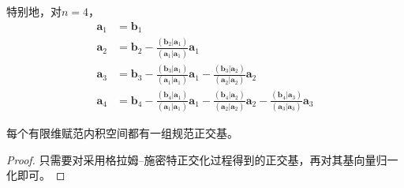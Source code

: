 \documentclass[../main.tex]{subfiles}
\begin{document}
特别地，对$n=4$，
\begin{align*}
    \mathbf{a}_1 & =\mathbf{b}_1                                                                                                                                                                                                                                                                                                       \\
    \mathbf{a}_2 & =\mathbf{b}_2-\frac{\left(\mathbf{b}_2|\mathbf{a}_1\right)}{\left(\mathbf{a}_1|\mathbf{a}_1\right)}\mathbf{a}_1                                                                                                                                                                                                     \\
    \mathbf{a}_3 & =\mathbf{b}_3-\frac{\left(\mathbf{b}_3|\mathbf{a}_1\right)}{\left(\mathbf{a}_1|\mathbf{a}_1\right)}\mathbf{a}_1-\frac{\left(\mathbf{b}_3|\mathbf{a}_2\right)}{\left(\mathbf{a}_2|\mathbf{a}_2\right)}\mathbf{a}_2                                                                                                   \\
    \mathbf{a}_4 & =\mathbf{b}_4-\frac{\left(\mathbf{b}_4|\mathbf{a}_1\right)}{\left(\mathbf{a}_1|\mathbf{a}_1\right)}\mathbf{a}_1-\frac{\left(\mathbf{b}_4|\mathbf{a}_2\right)}{\left(\mathbf{a}_2|\mathbf{a}_2\right)}\mathbf{a}_2-\frac{\left(\mathbf{b}_4|\mathbf{a}_3\right)}{\left(\mathbf{a}_3|\mathbf{a}_3\right)}\mathbf{a}_3
\end{align*}

\begin{corollary}
    每个有限维赋范内积空间都有一组规范正交基。
\end{corollary}
\begin{proof}
    只需要对采用格拉姆--施密特正交化过程得到的正交基，再对其基向量归一化即可。
\end{proof}
\end{document}
